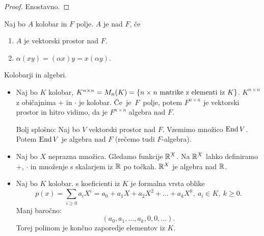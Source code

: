 \begin{proof}
    Enostavno.
\end{proof}

\begin{definicija}
    Naj bo $A$ kolobar in $F$ polje. $A$ je  nad $F$, če 
    \begin{enumerate}
        \item $A$ je vektorski prostor nad $F$.
        \item $\alpha(xy) = (\alpha x)y = x(\alpha y)$.
    \end{enumerate}
\end{definicija}

\begin{zgled}
    Kolobarji in algebri.
    \begin{itemize}
        \item Naj bo $K$ kolobar, $K^{n \times n} = M_n(K) = \left\{n \times n \text{ matrike z elementi iz } K\right\}$. $K^{n \times n}$ z običajnima $+$ in $\cdot$ je kolobar. Če~je~$F$~polje, potem $F^{n \times n}$ je vektorski prostor in hitro vidimo, da je $F^{n \times n}$ algebra nad $F$.
        
        Bolj splošno: Naj bo $V$ vektorski prostor nad $F$. Vzemimo množico $\operatorname{End} V$. Potem $\operatorname{End} V$ je algebra nad $F$ (rečemo tudi $F$-algebra).
        \item Naj bo $X$ neprazna množica. Gledamo funkcije $\mathbb{R}^X$. Na $\mathbb{R}^X$ lahko definiramo $+$, $\cdot$ in množenje s skalarjem iz $\mathbb{R}$ po točkah. $\mathbb{R}^X$ je algebra nad $\mathbb{R}$.
        
        \newpage
        \item Naj bo $K$ kolobar.  s koeficienti iz $K$ je formalna vrsta oblike
        $$p(x) = \sum_{i \geq 0} a_iX^i = a_0 + a_1X + a_2 X^2 + \ldots + a_k X^k, \ a_i \in K, \ k \geq 0.$$
        Manj baročno:
        $$(a_0, a_1, \ldots, a_k, 0, 0, \ldots).$$
        Torej polinom je končno zaporedje elementov iz $K$.


\end{itemize}
\end{zgled}
